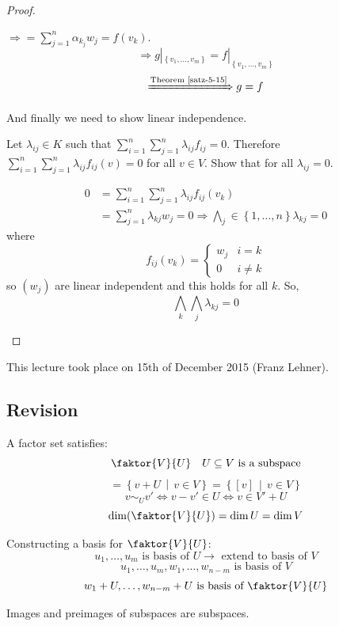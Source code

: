 \documentclass[a4paper,landscape,twocolumn]{article}
\newcommand\meta[3]{This #1 took place on #2 (#3).\par}
\newcommand\set[1]{\left\{#1\right\}}
\newcommand\setdef[2]{\left\{#1\,\middle|\,#2\right\}}
\begin{document}
\begin{proof}
\begin{enumerate}
      $\Rightarrow = \sum_{j=1}^n \alpha_{k_j} w_j = f(v_k)$.
      \[ \Rightarrow g|_{\set{v_1, \dots, v_m}} = f|_{\set{v_1, \dots, v_m}} \]
      \[ \xRightarrow{\text{Theorem~\ref{satz-5-15}}} g = f \]

      And finally we need to show linear independence.

      Let $\lambda_{ij} \in K$ such that $\sum_{i=1}^n \sum_{j=1}^n \lambda_{ij} f_{ij} = 0$.
      Therefore $\sum_{i=1}^n \sum_{j=1}^n \lambda_{ij} f_{ij}(v) = 0$ for all $v \in V$.
      Show that for all $\lambda_{ij} = 0$.

      \begin{align*}
        0 &= \sum_{i=1}^n \sum_{j=1}^n \lambda_{ij} f_{ij}(v_k) \\
          &= \sum_{j=1}^n \lambda_{kj} w_j = 0 \Rightarrow \bigwedge_j \in \set{1,\dots,n} \lambda_{kj} = 0
      \end{align*}
      where
      \[ f_{ij}(v_k) = \begin{cases} w_{j} & i = k \\ 0 & i \neq k \end{cases} \]
      so $(w_j)$ are linear independent and this holds for all $k$. So,
      \[ \bigwedge_{k} \bigwedge_j \lambda_{kj} = 0 \]
  \end{enumerate}
\end{proof}

\meta{lecture}{15th of December 2015}{Franz Lehner}

\subsection{Revision}

A factor set satisfies:
\[ \faktor{V}{U} \quad U \subseteq V \text{ is a subspace} \]
\[ = \setdef{v +  U}{v \in V} = \setdef{[v]}{v \in V} \]
\[ v \sim_U v' \Leftrightarrow v - v' \in U \Leftrightarrow v \in V' + U \]
\[ \dim(\faktor{V}{U}) = \dim{U} = \dim{V} \]

Constructing a basis for $\faktor{V}{U}$:
\[ u_1, \dots, u_m \text{ is basis of } U \rightarrow \text{ extend to basis of } V \]
\[ u_1, \dots, u_m, w_1, \dots, w_{n-m} \text{ is basis of } V \]
\[ w_1+U, \dots, w_{n-m}+U \text{ is basis of } \faktor{V}{U} \]

Images and preimages of subspaces are subspaces.
\end{document}
